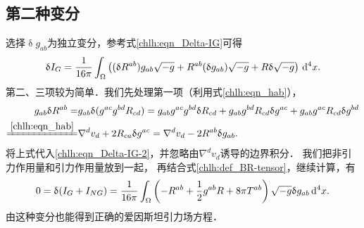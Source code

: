 \subsection{第二种变分}
选择$\updelta g_{ab}$为独立变分，参考式\eqref{chlh:eqn_Delta-IG}可得
\begin{equation}\label{chlh:eqn_Delta-IG-2}
        \updelta I_G
        = \frac{1}{16\pi } \int_\Omega
        \left( (\updelta R^{ab}) g_{ab} \sqrt{-g}
        + R^{ab} (\updelta g_{ab}) \sqrt{-g}
        +R \updelta \sqrt{-g} \right) \,{\rm d}^{4}x .
\end{equation}
第二、三项较为简单．我们先处理第一项（利用式\eqref{chlh:eqn_hab}），
\begin{align*}
    g_{ab} \updelta R^{ab} =& g_{ab} \updelta (g^{ac}g^{bd}R_{cd})
     =g_{ab} g^{ac}g^{bd} \updelta R_{cd}
     + g_{ab} g^{bd}R_{cd} \updelta g^{ac}
     + g_{ab} g^{ac}R_{cd} \updelta g^{bd} \\
     \xlongequal{\ref{chlh:eqn_hab}}& \nabla^d v_d
     + 2R_{ca} \updelta g^{ac}
     =\nabla^d v_d -2 R^{ab} \updelta g_{ab}.
\end{align*}
将上式代入\eqref{chlh:eqn_Delta-IG-2}，并忽略由$\nabla^d v_d $诱导的边界积分．
我们把非引力作用量和引力作用量放到一起，
再结合式\eqref{chlh:def_BR-tensor}，继续计算，有
\begin{equation}
    0=\updelta (I_G +I_{NG})
    = \frac{1}{16\pi } \int_\Omega
    \left( -R^{ab}  + \frac{1}{2} g^{ab} R + 8\pi T^{ab}\right)
    \sqrt{-g} \updelta g_{ab}  \,{\rm d}^{4}x .
\end{equation}
由这种变分也能得到正确的爱因斯坦引力场方程．




